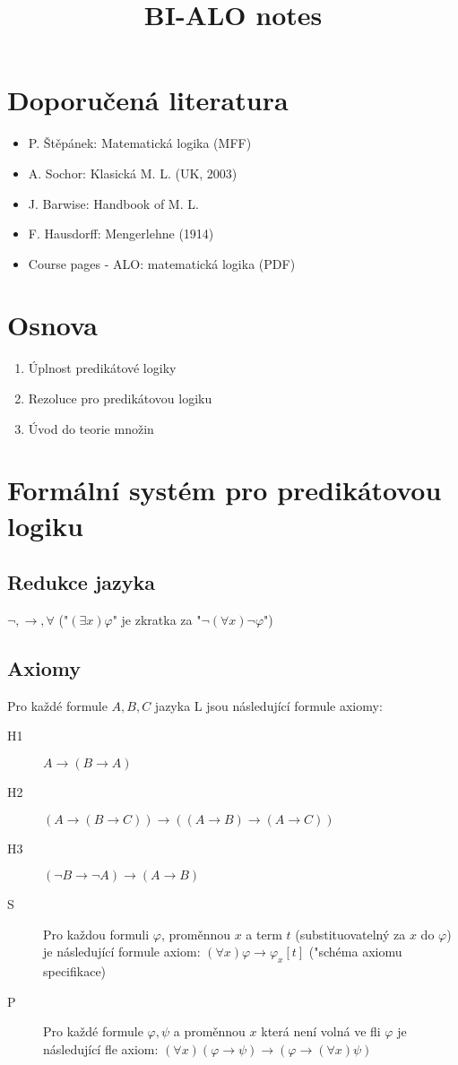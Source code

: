 \documentclass[a4paper]{article}
\title{BI-ALO notes}
\begin{document}
	\maketitle

	\section{Doporučená literatura}
	\begin{itemize}
		\item P. Štěpánek: Matematická logika (MFF)
		\item A. Sochor: Klasická M. L. (UK, 2003)
		\item J. Barwise: Handbook of M. L.
		\item F. Hausdorff: Mengerlehne (1914)
		\item Course pages - ALO: matematická logika (PDF)
	\end{itemize}

	\section{Osnova}
	\begin{enumerate}
		\item Úplnost predikátové logiky
		\item Rezoluce pro predikátovou logiku
		\item Úvod do teorie množin
	\end{enumerate}

	\section{Formální systém pro predikátovou logiku}
	\subsection{Redukce jazyka}
	$\neg, \to,  \forall$ ("$(\exists x) \varphi$" je zkratka za "$\neg (\forall x) \neg \varphi$")

	\subsection{Axiomy}
	Pro každé formule $A, B, C$ jazyka L jsou následující formule axiomy:
	\begin{description}
		\item[H1] $A \to (B \to A)$
		\item[H2] $(A \to (B \to C)) \to ((A \to B) \to (A \to C))$
		\item[H3] $(\neg B \to \neg A) \to (A \to B)$
		\item[S] Pro každou formuli $\varphi$, proměnnou $x$ a term $t$ (substituovatelný za $x$ do $\varphi$)
			je následující formule axiom: $(\forall x) \varphi \to \varphi_x[t]$ ("schéma axiomu specifikace)
		\item[P] Pro každé formule $\varphi, \psi$ a proměnnou $x$ která není volná ve fli $\varphi$ je
			následující fle axiom:  $(\forall x)(\varphi \to \psi) \to (\varphi \to (\forall x) \psi)$
	\end{description}
\end{document}
